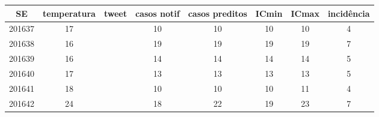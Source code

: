 \begin{tabular}{c|ccccccc}
  \hline
SE & temperatura & tweet & casos notif & casos preditos & ICmin & ICmax & incidência \\ 
  \hline
201637 & 17 &  & 10 & 10 & 10 & 10 & 4 \\ 
  201638 & 16 &  & 19 & 19 & 19 & 19 & 7 \\ 
  201639 & 16 &  & 14 & 14 & 14 & 14 & 5 \\ 
  201640 & 17 &  & 13 & 13 & 13 & 13 & 5 \\ 
  201641 & 18 &  & 10 & 10 & 10 & 11 & 4 \\ 
  201642 & 24 &  & 18 & 22 & 19 & 23 & 7 \\ 
   \hline
\end{tabular}
